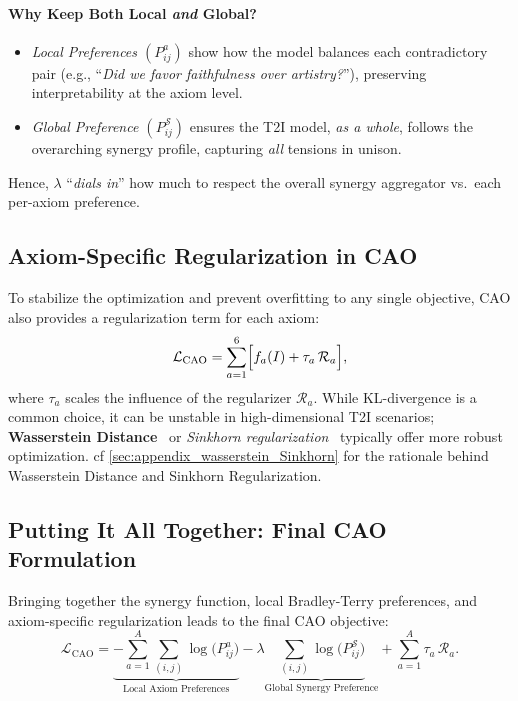 \paragraph{Why Keep Both Local \emph{and} Global?}
\begin{itemize}[left=5pt]
\item 
\emph{Local Preferences \((P_{ij}^a)\)} show how the model balances each contradictory pair (e.g., “\emph{Did we favor faithfulness over artistry?}”), preserving interpretability at the axiom level.
\item 
\emph{Global Preference \((P_{ij}^{\mathcal{S}})\)} ensures the T2I model, \emph{as a whole}, follows the overarching synergy profile, capturing \emph{all} tensions in unison.
\end{itemize}
Hence, \(\lambda\) “\emph{dials in}” how much to respect the overall synergy aggregator vs.\ each per-axiom preference.

\subsection{Axiom-Specific Regularization in CAO}

To stabilize the optimization and prevent overfitting to any single objective, CAO also provides a regularization term for each axiom:
\[
\mathcal{L}_{\text{CAO}}
=
\sum_{a=1}^6
\Bigl[
  f_a(I) 
  + 
  \tau_a \,\mathcal{R}_a
\Bigr],
\]
where \(\tau_a\) scales the influence of the regularizer \(\mathcal{R}_a\). While KL-divergence is a common choice, it can be unstable in high-dimensional T2I scenarios; \textbf{Wasserstein Distance}~\cite{arjovsky2017wasserstein} or \emph{Sinkhorn regularization}~\cite{cuturi2013sinkhorn} typically offer more robust optimization. cf \cref{sec:appendix_wasserstein_Sinkhorn} for the rationale behind Wasserstein Distance and Sinkhorn Regularization.








\subsection{Putting It All Together: Final CAO Formulation}

Bringing together the synergy function, local Bradley-Terry preferences, and axiom-specific regularization leads to the final CAO objective:
\[
\mathcal{L}_{\text{CAO}}
=
\underbrace{
- \sum_{a=1}^{A} 
  \sum_{(i,j)}
  \log\!\bigl(P_{ij}^a\bigr)
}_{\text{Local Axiom Preferences}}
-
\lambda
\underbrace{
\sum_{(i,j)}
\log\!\bigl(P_{ij}^{\mathcal{S}}\bigr)
}_{\text{Global Synergy Preference}}
+
\sum_{a=1}^{A}
\tau_a\,\mathcal{R}_a.
\]




